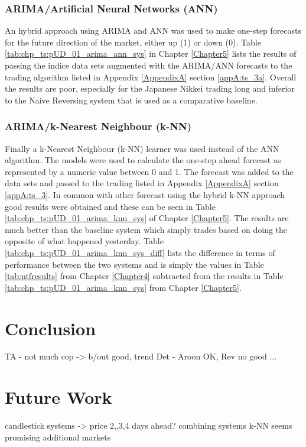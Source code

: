 \subsubsection{ARIMA/Artificial Neural Networks (ANN)}
An hybrid approach using ARIMA and ANN was used to make one-step forecasts for the future direction of the market, either up (1) or down (0). Table \ref{tab:chp_ts:pUD_01_arima_ann_sys} in Chapter \ref{Chapter5} lists the results of passing the indice data sets augmented with the ARIMA/ANN forecasts to the trading algorithm listed in Appendix \ref{AppendixA} section \ref{appA:ts_3a}.  Overall the results are poor, especially for the Japanese Nikkei trading long and inferior to the Naive Reversing system that is used as a comparative baseline.

\subsubsection{ARIMA/k-Nearest Neighbour (k-NN)}
Finally a k-Nearest Neighbour (k-NN) learner was used instead of the ANN algorithm. The models were used to calculate the one-step ahead forecast as represented by a numeric value between 0 and 1. The forecast was added to the data sets and passed to the trading listed in Appendix \ref{AppendixA} section \ref{appA:ts_3}. In common with other forecast using the hybrid k-NN approach good results were obtained and these can be seen in Table \ref{tab:chp_ts:pUD_01_arima_knn_sys} of Chapter \ref{Chapter5}. The results are much better than the baseline system which simply trades based on doing the opposite of what happened yesterday. Table \ref{tab:chp_ts:pUD_01_arima_knn_sys_diff} lists the difference in terms of performance between the two systems and is simply the values in  Table \ref{tab:ntfresults} from Chapter \ref{Chapter4} subtracted from the results in Table \ref{tab:chp_ts:pUD_01_arima_knn_sys} from Chapter \ref{Chapter5}.





\section{Conclusion}

TA - not much cop -> b/out good, trend Det - Aroon OK, Rev no good ...

\section{Future Work}
candlestick systems -> price 2,,3,4 days ahead?
combining systems
k-NN seems promising
additional markets
